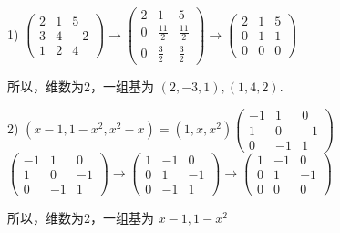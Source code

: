 \documentclass[13pt]{beamer}
\begin{document}
\begin{frame}
1) 
$\left(\begin{array}{ccc}2 & 1 & 5 \\ 3 & 4 & -2 \\ 1 & 2 & 4\end{array}\right) \rightarrow\left(\begin{array}{ccc}2 & 1 & 5 \\ 0 & \frac{11}{2} & \frac{11}{2} \\ 0 & \frac{3}{2} & \frac{3}{2}\end{array}\right) \rightarrow\left(\begin{array}{ccc}2 & 1 & 5 \\ 0 & 1 & 1 \\ 0 & 0 & 0\end{array}\right)$

所以，维数为2，一组基为 $(2,-3,1), (1,4,2)$.

2) 
$\left(x-1,1-x^{2}, x^{2}-x\right)=\left(1, x, x^{2}\right)\left(\begin{array}{ccc}-1 & 1 & 0 \\ 1 & 0 & -1 \\ 0 & -1 & 1\end{array}\right)$
$\left(\begin{array}{ccc}-1 & 1 & 0 \\ 1 & 0 & -1 \\ 0 & -1 & 1\end{array}\right) \rightarrow\left(\begin{array}{ccc}1 & -1 & 0 \\ 0 & 1 & -1 \\ 0 & -1 & 1\end{array}\right) \rightarrow\left(\begin{array}{ccc}1 & -1 & 0 \\ 0 & 1 & -1 \\ 0 & 0 & 0\end{array}\right)$

所以，维数为2，一组基为 $x-1,1-x^{2}$
\end{frame}
\end{document}
